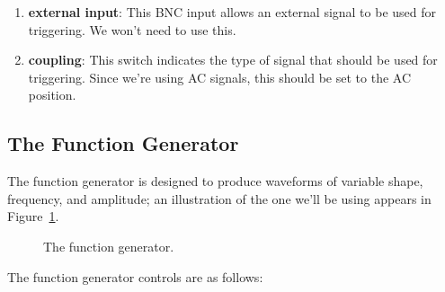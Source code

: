 \begin{enumerate}
\begin{enumerate}
	\item {\bf external input}: This BNC input allows an external signal
to be used for triggering. We won't need to use this.
	
	\item {\bf coupling}: This switch indicates the type of signal that 
should be used for triggering.  Since we're using AC signals, this should be
set to the AC position.
	\end{enumerate}

\end{enumerate}

\subsection{The Function Generator}

The function generator is designed to produce waveforms of variable shape,
frequency, and amplitude; an illustration of the one we'll be using appears in
Figure~\ref{fig:scope:functiongen}.
\begin{figure}[htb]
\centerline{\epsfxsize=14cm }
\caption{The function generator.}
\label{fig:scope:functiongen}
\end{figure}
The function generator controls are as follows:

